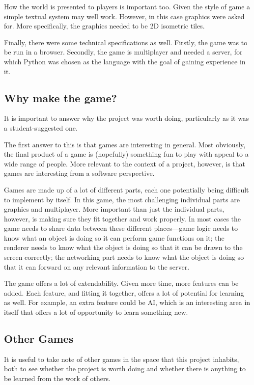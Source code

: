How the world is presented to players is important too. Given the style of game a simple textual system may well work. However, in this case graphics were asked for. More specifically, the graphics needed to be 2D isometric tiles.

Finally, there were some technical specifications as well. Firstly, the game was to be run in a browser. Secondly, the game is multiplayer and needed a server, for which Python was chosen as the language with the goal of gaining experience in it.

\subsection{Why make the game?}
It is important to answer why the project was worth doing, particularly as it was a student-suggested one.

The first answer to this is that games are interesting in general. Most obviously, the final product of a game is (hopefully) something fun to play with appeal to a wide range of people. More relevant to the context of a project, however, is that games are interesting from a software perspective.

Games are made up of a lot of different parts, each one potentially being difficult to implement by itself. In this game, the most challenging individual parts are graphics and multiplayer. More important than just the individual parts, however, is making sure they fit together and work properly. In most cases the game needs to share data between these different places---game logic needs to know what an object is doing so it can perform game functions on it; the renderer needs to know what the object is doing so that it can be drawn to the screen correctly; the networking part needs to know what the object is doing so that it can forward on any relevant information to the server.

The game offers a lot of extendability. Given more time, more features can be added. Each feature, and fitting it together, offers a lot of potential for learning as well. For example, an extra feature could be AI, which is an interesting area in itself that offers a lot of opportunity to learn something new.

\subsection{Other Games}
It is useful to take note of other games in the space that this project inhabits, both to see whether the project is worth doing and whether there is anything to be learned from the work of others.




